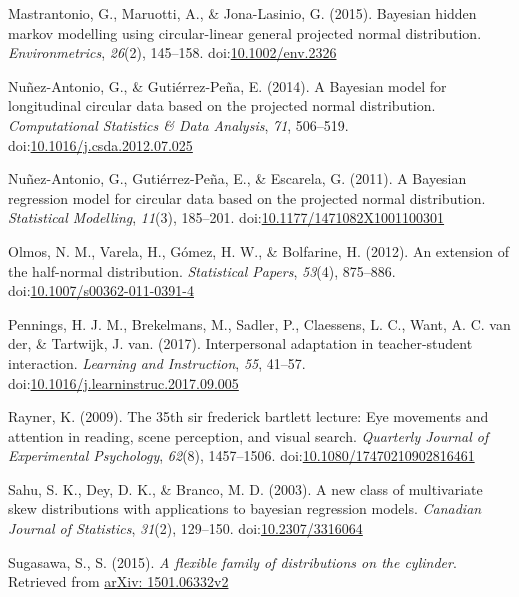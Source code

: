 \documentclass[11pt,]{article}
\begin{document}
\hypertarget{ref-mastrantonio2015bayesian}{}
Mastrantonio, G., Maruotti, A., \& Jona-Lasinio, G. (2015). Bayesian
hidden markov modelling using circular-linear general projected normal
distribution. \emph{Environmetrics}, \emph{26}(2), 145--158.
doi:\href{https://doi.org/10.1002/env.2326}{10.1002/env.2326}

\hypertarget{ref-nunez2014bayesian}{}
Nuñez-Antonio, G., \& Gutiérrez-Peña, E. (2014). A Bayesian model for
longitudinal circular data based on the projected normal distribution.
\emph{Computational Statistics \& Data Analysis}, \emph{71}, 506--519.
doi:\href{https://doi.org/10.1016/j.csda.2012.07.025}{10.1016/j.csda.2012.07.025}

\hypertarget{ref-nunez2011bayesian}{}
Nuñez-Antonio, G., Gutiérrez-Peña, E., \& Escarela, G. (2011). A
Bayesian regression model for circular data based on the projected
normal distribution. \emph{Statistical Modelling}, \emph{11}(3),
185--201.
doi:\href{https://doi.org/10.1177/1471082X1001100301}{10.1177/1471082X1001100301}

\hypertarget{ref-olmos2012extension}{}
Olmos, N. M., Varela, H., Gómez, H. W., \& Bolfarine, H. (2012). An
extension of the half-normal distribution. \emph{Statistical Papers},
\emph{53}(4), 875--886.
doi:\href{https://doi.org/10.1007/s00362-011-0391-4}{10.1007/s00362-011-0391-4}

\hypertarget{ref-pennings2017interpersonal}{}
Pennings, H. J. M., Brekelmans, M., Sadler, P., Claessens, L. C., Want,
A. C. van der, \& Tartwijk, J. van. (2017). Interpersonal adaptation in
teacher-student interaction. \emph{Learning and Instruction}, \emph{55},
41--57.
doi:\href{https://doi.org/10.1016/j.learninstruc.2017.09.005}{10.1016/j.learninstruc.2017.09.005}

\hypertarget{ref-rayner200935th}{}
Rayner, K. (2009). The 35th sir frederick bartlett lecture: Eye
movements and attention in reading, scene perception, and visual search.
\emph{Quarterly Journal of Experimental Psychology}, \emph{62}(8),
1457--1506.
doi:\href{https://doi.org/10.1080/17470210902816461}{10.1080/17470210902816461}

\hypertarget{ref-sahu2003new}{}
Sahu, S. K., Dey, D. K., \& Branco, M. D. (2003). A new class of
multivariate skew distributions with applications to bayesian regression
models. \emph{Canadian Journal of Statistics}, \emph{31}(2), 129--150.
doi:\href{https://doi.org/10.2307/3316064}{10.2307/3316064}

\hypertarget{ref-sugasawa2015flexible}{}
Sugasawa, S., S. (2015). \emph{A flexible family of distributions on the
cylinder}. Retrieved from
\href{arXiv:\%201501.06332v2}{arXiv: 1501.06332v2}
\end{document}
